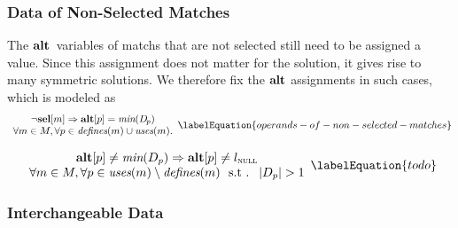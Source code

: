\subsubsection{Data of Non-Selected Matches}

The $\mVar{alt}$~\glspl{variable} of \glspl{match} that are not selected still
need to be assigned a value.
%
Since this assignment does not matter for the \gls{solution}, it gives rise to
many symmetric \glspl{solution}.
%
We therefore fix the $\mVar{alt}$ assignments in such cases, which is modeled as
%
\begin{equation}
  \begin{array}{c}
    \neg\mVar{sel}[m] \mImp \mVar{alt}[p] = \mMin(\mDataSet[\hspace{-1pt}p]) \\
    \forall m \in \mMatchSet,
    \forall p \in \mDefines(m) \cup \mUses(m).
  \end{array}
  \labelEquation{operands-of-non-selected-matches}
\end{equation}



\begin{equation}
  \begin{array}{c}
    \mVar{alt}[p] \neq \mMin(\mDataSet[p])
    \mImp
    \mVar{alt}[p] \neq \mNullLocation \\
    \forall m \in \mMatchSet,
    \forall p \in \mUses(m) \setminus \mDefines(m)
    \text{ \st }
    \mCard{\mDataSet[p]} > 1
  \end{array}
  \labelEquation{todo}
\end{equation}


\subsubsection{Interchangeable Data}

